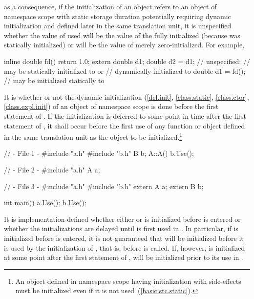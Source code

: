 \enternote as a consequence, if the initialization of an object  refers to an
object  of namespace scope with static storage duration
potentially requiring dynamic initialization and defined
later in the same translation unit, it is unspecified whether the value of  used
will be the value of the fully initialized  (because  was statically
initialized) or will be the value of  merely zero-initialized. For example,

\begin{codeblock}
inline double fd() { return 1.0; }
extern double d1;
double d2 = d1;			// unspecified:
				// may be statically initialized to  or
				// dynamically initialized to 
double d1 = fd();		// may be initialized statically to 
\end{codeblock}
\exitnoteb

\pnum
{}%
It is  whether or not the
dynamic initialization (\ref{dcl.init}, \ref{class.static}, \ref{class.ctor},
\ref{class.expl.init}) of an object of namespace scope is
done before the first statement of . If the initialization is deferred to
some point in time after the first statement of , it shall occur before the
first use of any function or object
defined in the same translation unit as the object
to be initialized.\footnote{An object defined in namespace scope
having initialization
with side-effects must be initialized even if it is not
used~(\ref{basic.stc.static}).}
\enterexample 

\begin{codeblock}
// - File 1 -
#include "a.h"
#include "b.h"
B b;
A::A(){
	b.Use();
}

// - File 2 -
#include "a.h"
A a;

// - File 3 -
#include "a.h"
#include "b.h"
extern A a;
extern B b;

int main() {
	a.Use();
	b.Use();
}
\end{codeblock}

It is implementation-defined whether either  or  is
initialized before  is entered or whether the
initializations are delayed until  is first used in
. In particular, if  is initialized before
 is entered, it is not guaranteed that  will be
initialized before it is used by the initialization of , that
is, before  is called. If, however,  is initialized
at some point after the first statement of ,  will
be initialized prior to its use in . \exitexample

